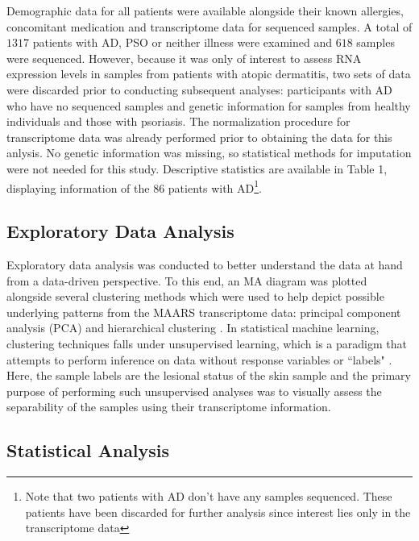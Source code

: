 \documentclass[journal, a4paper]{IEEEtran}
\begin{document}
Demographic data for all patients were available alongside their known allergies, concomitant medication and transcriptome data for sequenced samples. A total of $1317$ patients with AD, PSO or neither illness were examined and $618$ samples were sequenced. However, because it was only of interest to assess RNA expression levels in samples from patients with atopic dermatitis, two sets of data were discarded prior to conducting subsequent analyses: participants with AD who have no sequenced samples and genetic information for samples from healthy individuals and those with psoriasis. The normalization procedure for transcriptome data was already performed prior to obtaining the data for this anlysis. No genetic information was missing, so statistical methods for imputation were not needed for this study. Descriptive statistics are available in Table 1, displaying information of the 86 patients with AD\footnote{Note that two patients with AD don't have any samples sequenced. These patients have been discarded for further analysis since interest lies only in the transcriptome data}.


\subsection{\textbf{Exploratory Data Analysis}}

Exploratory data analysis was conducted to better understand the data at hand from a data-driven perspective. To this end, an MA diagram was plotted alongside several clustering methods which were used to help depict possible underlying patterns from the MAARS transcriptome data: principal component analysis (PCA) and hierarchical clustering \cite{maaten2008visualizing, friedman2001elements}. In statistical machine learning, clustering techniques falls under unsupervised learning, which is a paradigm that attempts to perform inference on data without response variables or ``labels" \cite{friedman2001elements}. Here, the sample labels are the lesional status of the skin sample and the primary purpose of performing such unsupervised analyses was to visually assess the separability of the samples using their transcriptome information.

\subsection{\textbf{Statistical Analysis}}

\end{document}
